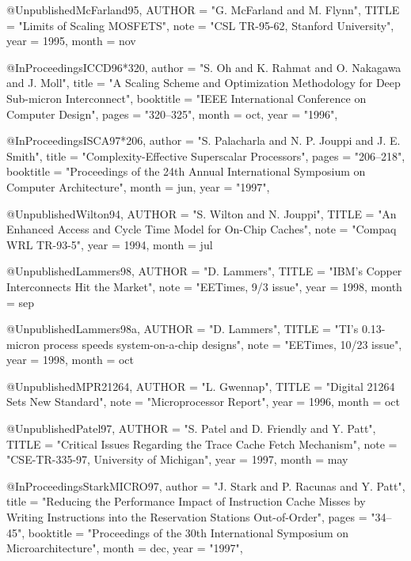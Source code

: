 @Unpublished{McFarland95,
        AUTHOR = "G. McFarland and M. Flynn",
        TITLE = "Limits of Scaling MOSFETS",
        note = "CSL TR-95-62, Stanford University",
        year =  1995,
	month = nov
}

@InProceedings{ICCD96*320,
  author =       "S. Oh and K. Rahmat and O. Nakagawa and J. Moll",
  title =        "A Scaling Scheme and Optimization Methodology for Deep
                 Sub-micron Interconnect",
  booktitle =    "IEEE International Conference on Computer Design",
  pages =        "320--325",
  month =        oct,
  year =         "1996",
}

@InProceedings{ISCA97*206,
  author =       "S. Palacharla and N. P. Jouppi and J. E.
                 Smith",
  title =        "Complexity-Effective Superscalar Processors",
  pages =        "206--218",
  booktitle =    "Proceedings of the 24th Annual International Symposium
                 on Computer Architecture",
  month =        jun,
  year =         "1997",
}

@Unpublished{Wilton94,
        AUTHOR = "S. Wilton and N. Jouppi",
        TITLE = "An Enhanced Access and Cycle Time Model for On-Chip Caches",
        note = "Compaq WRL TR-93-5",
        year =  1994,
        month = jul
}

@Unpublished{Lammers98,
        AUTHOR = "D. Lammers",
        TITLE = "{IBM}'s Copper Interconnects Hit the Market",
        note = "EETimes, 9/3 issue",
        year =  1998,
        month = sep
}

@Unpublished{Lammers98a,
        AUTHOR = "D. Lammers",
        TITLE = "{TI's} 0.13-micron process speeds system-on-a-chip designs",
        note = "EETimes, 10/23 issue",
        year =  1998,
        month = oct
}

@Unpublished{MPR21264,
        AUTHOR = "L. Gwennap",
        TITLE = "Digital 21264 Sets New Standard",
        note = "Microprocessor Report",
        year =  1996,
        month = oct
}

@Unpublished{Patel97,
        AUTHOR = "S. Patel and D. Friendly and Y. Patt",
        TITLE = "Critical Issues Regarding the Trace Cache Fetch Mechanism",
        note = "CSE-TR-335-97, University of Michigan",
        year =  1997,
        month = may
}

@InProceedings{StarkMICRO97,
  author =       "J. Stark and P. Racunas and Y. Patt",
  title =        "Reducing the Performance Impact of Instruction Cache
                 Misses by Writing Instructions into the Reservation
                 Stations Out-of-Order",
  pages =        "34--45",
  booktitle =    "Proceedings of the 30th
                 International Symposium on Microarchitecture",
  month =        dec,
  year =         "1997",
}

